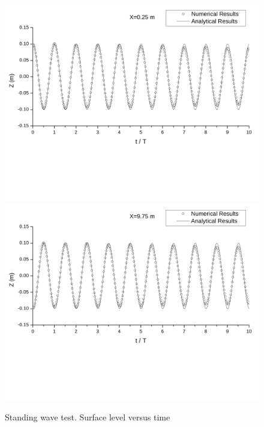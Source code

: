 \begin{figure}[htbp]
\begin{center}
\vspace{0.3in}
\hspace{0.0in}
\includegraphics[scale=0.50]{../figures/StanWav/StanWav-Height-vs-Time-x=025.pdf}
\vspace{0.5in}
\hspace{0.0in}
\includegraphics[scale=0.50]{../figures/StanWav/StanWav-Height-vs-Time-x=975.pdf}
\caption{Standing wave test. Surface level versus time}
\label{fig:StanWav-Height-vs-Time}
\end{center}
\end{figure}

